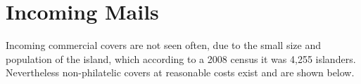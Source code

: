 
\chapter{Incoming Mails}  

Incoming commercial covers are not seen often, due to the small size and population of the island, which according to a 2008 census it was 4,255 islanders. Nevertheless non-philatelic covers at reasonable costs exist and are shown below.



  